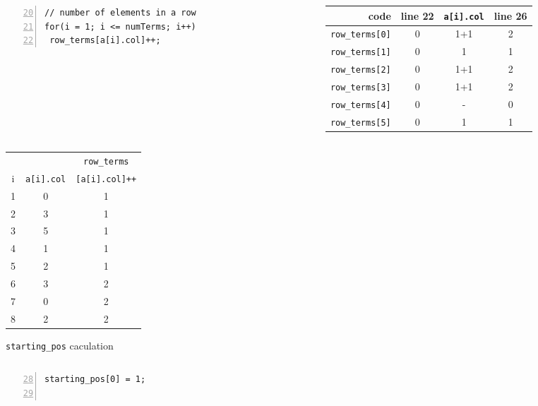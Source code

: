\documentclass[newPxFont,sthlmFooter,nooffset]{beamer}
\begin{document}
\begin{frame}
\begin{columns}
\begin{column}{0.5\textwidth}
\begin{lstlisting}[frame=single, lineskip = -1pt, numbers = left, firstnumber=20, framexleftmargin=15pt, framexrightmargin=-5pt, xleftmargin = 25pt ]
// number of elements in a row
for(i = 1; i <= numTerms; i++)
 row_terms[a[i].col]++;  
\end{lstlisting}
\end{column}
  \begin{column}{0.5\textwidth}
{\scriptsize
    \begin{tabular} {r | c |c |c}
      code & line 22 & \texttt{a[i].col} & line 26 \\ \hline
      \texttt{row\_terms[0]} & 0  & 1+1 & 2 \\
      \texttt{row\_terms[1]} & 0  & 1   & 1 \\
      \texttt{row\_terms[2]} & 0  & 1+1 & 2 \\
      \texttt{row\_terms[3]} & 0  & 1+1 & 2 \\
      \texttt{row\_terms[4]} & 0  & -   & 0 \\
      \texttt{row\_terms[5]} & 0  & 1   & 1 \\
    \end{tabular}
}        
  \end{column}

\end{columns}



{\scriptsize
\begin{tabular} {c | c | c}
   & & \texttt{row\_terms} \\ 
  i &\texttt{a[i].col}  & \texttt{[a[i].col]++} \\ \hline
  1 & 0 & 1 \\
  2 & 3 & 1 \\
  3 & 5 & 1 \\
  4 & 1 & 1 \\
  5 & 2 & 1 \\
  6 & 3 & 2 \\
  7 & 0 & 2 \\
  8 & 2 & 2 \\
\end{tabular}
}
\framebreak

\texttt{starting\_pos} caculation

\begin{columns}
  \begin{column}{0.5\textwidth}
\begin{lstlisting}[frame=single, lineskip = -1pt, numbers = left, firstnumber=28, framexleftmargin=15pt, framexrightmargin=-5pt, xleftmargin = 25pt ]
starting_pos[0] = 1;


\end{lstlisting}
\end{column}
\end{columns}
\end{frame}
\end{document}
